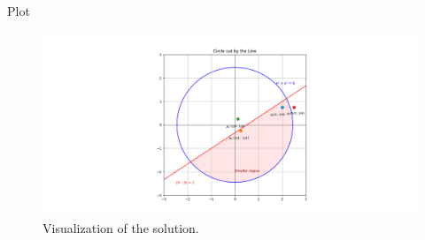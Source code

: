 \documentclass{beamer}
\begin{document}
\begin{frame}{Plot}
  \begin{figure}
    \centering
    \includegraphics[width=\textwidth]{../figs/figure_py.png}
    \caption{Visualization of the solution.}
    \label{fig:final_plot}
  \end{figure}
\end{frame}
\end{document}

